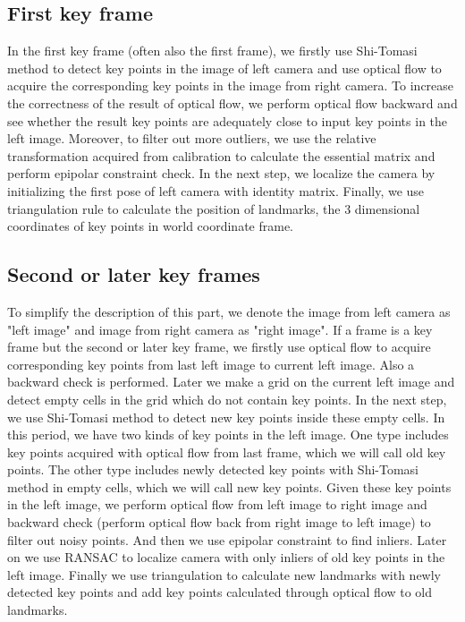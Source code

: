 \documentclass{easychair}
\begin{document}
\subsection{First key frame}
In the first key frame (often also the first frame), we firstly use Shi-Tomasi method to detect key points in the image of left camera and use optical flow to acquire the corresponding key points in the image from right camera. To increase the correctness of the result of optical flow, we perform optical flow backward and see whether the result key points are adequately close to input key points in the left image. Moreover, to filter out more outliers, we use the relative transformation acquired from calibration to calculate the essential matrix and perform epipolar constraint check. In the next step, we localize the camera by initializing the first pose of left camera with identity matrix. Finally, we use triangulation rule to calculate the position of landmarks, the 3 dimensional coordinates of key points in world coordinate frame. 

\subsection{Second or later key frames}
To simplify the description of this part, we denote the image from left camera as "left image" and image from right camera as "right image". If a frame is a key frame but the second or later key frame, we firstly use optical flow to acquire corresponding key points from last left image to current left image. Also a backward check is performed. Later we make a grid on the current left image and detect empty cells in the grid which do not contain key points. In the next step, we use Shi-Tomasi method to detect new key points inside these empty cells. In this period, we have two kinds of key points in the left image. One type includes key points acquired with optical flow from last frame, which we will call old key points. The other type includes newly detected key points with Shi-Tomasi method in empty cells, which we will call new key points. Given these key points in the left image, we perform optical flow from left image to right image and backward check (perform optical flow back from right image to left image) to filter out noisy points. And then we use epipolar constraint to find inliers. Later on we use RANSAC to localize camera with only inliers of old key points in the left image. Finally we use triangulation to calculate new landmarks with newly detected key points and add key points calculated through optical flow to old landmarks.
\end{document}
